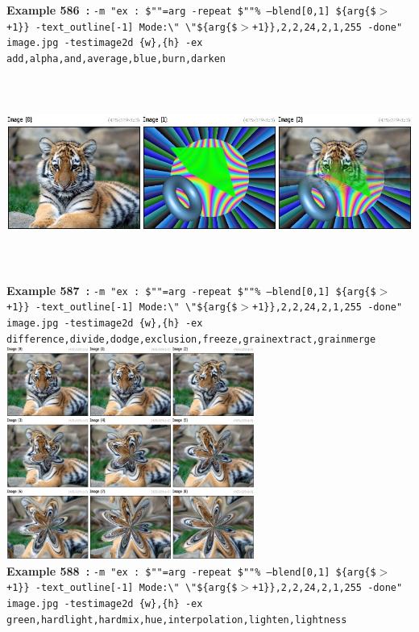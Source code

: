 \documentclass[a4paper,11pt,twoside]{book}
\begin{document}
\begin{center}
{\footnotesize \textbf{Example 586~:} \texttt{-m "ex : \$""=arg -repeat \$""\% --blend[0,1] \$\{arg\{\$$>$+1\}\} -text\_outline[-1] Mode:\textbackslash " \textbackslash "\$\{arg\{\$$>$+1\}\},2,2,24,2,1,255 -done" image.jpg -testimage2d \{w\},\{h\} -ex add,alpha,and,average,blue,burn,darken}}
\\\includegraphics[keepaspectratio=true,height=7cm,width=\textwidth]{img/gmic_def587.jpg}\\
{\footnotesize \textbf{Example 587~:} \texttt{-m "ex : \$""=arg -repeat \$""\% --blend[0,1] \$\{arg\{\$$>$+1\}\} -text\_outline[-1] Mode:\textbackslash " \textbackslash "\$\{arg\{\$$>$+1\}\},2,2,24,2,1,255 -done" image.jpg -testimage2d \{w\},\{h\} -ex difference,divide,dodge,exclusion,freeze,grainextract,grainmerge}}
\\\includegraphics[keepaspectratio=true,height=7cm,width=\textwidth]{img/gmic_def588.jpg}\\
{\footnotesize \textbf{Example 588~:} \texttt{-m "ex : \$""=arg -repeat \$""\% --blend[0,1] \$\{arg\{\$$>$+1\}\} -text\_outline[-1] Mode:\textbackslash " \textbackslash "\$\{arg\{\$$>$+1\}\},2,2,24,2,1,255 -done" image.jpg -testimage2d \{w\},\{h\} -ex green,hardlight,hardmix,hue,interpolation,lighten,lightness}}

\end{center}
\end{document}
